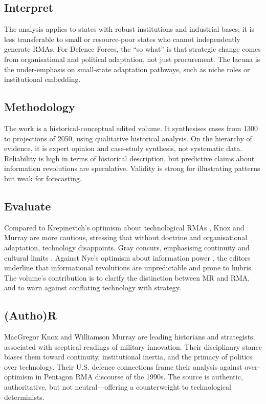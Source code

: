 \subsection*{Interpret}
The analysis applies to states with robust institutions and industrial bases; it is less transferable to small or resource-poor states who cannot independently generate RMAs. For Defence Forces, the ``so what'' is that strategic change comes from organisational and political adaptation, not just procurement. The lacuna is the under-emphasis on small-state adaptation pathways, such as niche roles or institutional embedding.

\subsection*{Methodology}
The work is a historical-conceptual edited volume. It synthesises cases from 1300 to projections of 2050, using qualitative historical analysis. On the hierarchy of evidence, it is expert opinion and case-study synthesis, not systematic data. Reliability is high in terms of historical description, but predictive claims about information revolutions are speculative. Validity is strong for illustrating patterns but weak for forecasting.

\subsection*{Evaluate}
Compared to Krepinevich’s optimism about technological RMAs \parencite{KREPINEVICH_1994}, Knox and Murray are more cautious, stressing that without doctrine and organisational adaptation, technology disappoints. Gray concurs, emphasising continuity and cultural limits \parencite{GRAY_2005}. Against Nye’s optimism about information power \parencite{NYE_2008}, the editors underline that informational revolutions are unpredictable and prone to hubris. The volume’s contribution is to clarify the distinction between MR and RMA, and to warn against conflating technology with strategy.

\subsection*{(Autho)R}
MacGregor Knox and Williamson Murray are leading historians and strategists, associated with sceptical readings of military innovation. Their disciplinary stance biases them toward continuity, institutional inertia, and the primacy of politics over technology. Their U.S. defence connections frame their analysis against over-optimism in Pentagon RMA discourse of the 1990s. The source is authentic, authoritative, but not neutral—offering a counterweight to technological determinists.


